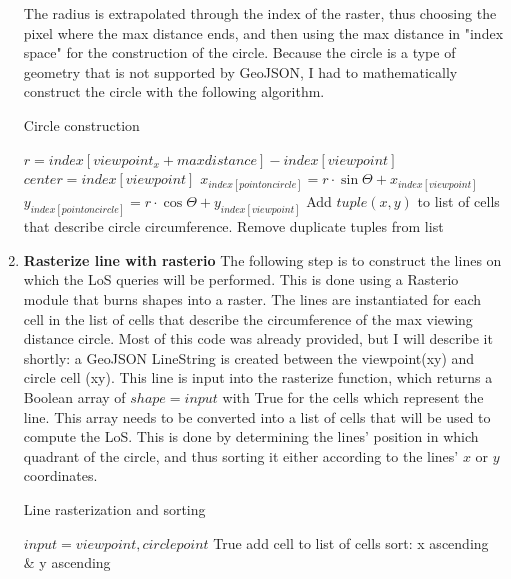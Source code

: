 \documentclass[a4paper]{article}
\begin{document}
\begin{enumerate}
    The radius is extrapolated through the index of the raster, thus choosing the pixel where the max distance ends, and then using the max distance in "index space" for the construction of the circle. Because the circle is a type of geometry that is not supported by GeoJSON, I had to mathematically construct the circle with the following algorithm. 
\begin{algorithm}
	\caption{Circle construction} 
	\begin{algorithmic}[1]
	\State $r = index[viewpoint_x + maxdistance] - index[viewpoint] $
	\State $center = index[viewpoint]$ 
		    \State $x_{index[point on circle]} = r \cdot \sin{\Theta} + x_{index[viewpoint]}$
		    \State $y_{index[point on circle]} = r \cdot \cos{\Theta} + y_{index[viewpoint]}$
		    \State Add $tuple(x,y)$ to list of cells that describe circle circumference.
		\EndFor
		\State Remove duplicate tuples from list 
	\end{algorithmic} 
\end{algorithm}
    \item{\bfseries{Rasterize line with rasterio}}\newline
    The following step is to construct the lines on which the LoS queries will be performed. This is done using a Rasterio module that burns shapes into a raster. The lines are instantiated for each cell in the list of cells that describe the circumference of the max viewing distance circle. Most of this code was already provided, but I will describe it shortly: a GeoJSON LineString is created between the viewpoint(xy) and circle cell (xy). This line is input into the rasterize function, which returns a Boolean array of $shape = input$ with True for the cells which represent the line. This array needs to be converted into a list of cells that will be used to compute the LoS. This is done by determining the lines' position in which quadrant of the circle, and thus sorting it either according to the lines' $x$ or $y$ coordinates.\newpage 
\begin{algorithm}
	\caption{Line rasterization and sorting} 
	\begin{algorithmic}[1]
	\State $input = viewpoint, circlepoint$
		    \State True
		\EndFor
		    \State add cell to list of cells
		\EndFor
		\State sort: x ascending \& y ascending

\end{algorithmic}
\end{algorithm}
\end{enumerate}
\end{document}
